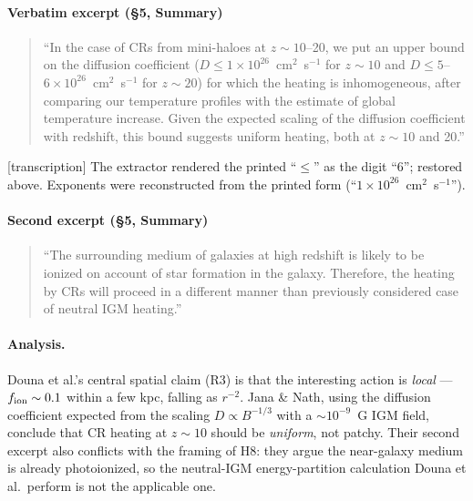 \documentclass[11pt,a4paper]{article}
\newcommand{\flag}[1]{\textcolor{orange!75!black}{\textsf{\small [#1]}}}
\begin{document}
\paragraph{Verbatim excerpt (\S5, Summary)}
\begin{quote}\small
``In the case of CRs from mini-haloes at $z\sim10$--20, we put an upper bound on
the diffusion coefficient ($D\le1\times10^{26}$~cm$^{2}$~s$^{-1}$ for $z\sim10$
and $D\le5$--$6\times10^{26}$~cm$^{2}$~s$^{-1}$ for $z\sim20$) for which the
heating is inhomogeneous, after comparing our temperature profiles with the
estimate of global temperature increase. Given the expected scaling of the
diffusion coefficient with redshift, this bound suggests uniform heating, both
at $z\sim10$ and 20.''
\end{quote}
\flag{transcription} The extractor rendered the printed ``$\le$'' as the digit
``6''; restored above. Exponents were reconstructed from the printed form
(``$1\times10^{26}$~cm$^{2}$~s$^{-1}$'').

\paragraph{Second excerpt (\S5, Summary)}
\begin{quote}\small
``The surrounding medium of galaxies at high redshift is likely to be ionized on
account of star formation in the galaxy. Therefore, the heating by CRs will
proceed in a different manner than previously considered case of neutral IGM
heating.''
\end{quote}

\paragraph{Analysis.}
Douna et al.'s central spatial claim (R3) is that the interesting action is
\emph{local} --- $f_{\rm ion}\sim0.1$ within a few kpc, falling as $r^{-2}$.
Jana \& Nath, using the diffusion coefficient expected from the scaling
$D\propto B^{-1/3}$ with a $\sim10^{-9}$~G IGM field, conclude that CR heating
at $z\sim10$ should be \emph{uniform}, not patchy. Their second excerpt also
conflicts with the framing of H8: they argue the near-galaxy medium is already
photoionized, so the neutral-IGM energy-partition calculation Douna et al.\
perform is not the applicable one.
\end{document}
